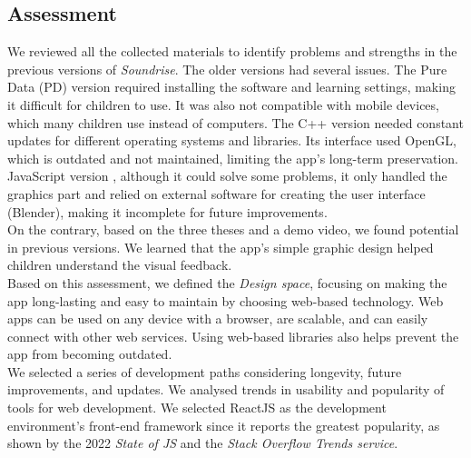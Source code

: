 \subsection*{Assessment}
We reviewed all the collected materials to identify problems and strengths in the previous versions of \textit{Soundrise}. The older versions had several issues. The Pure Data (PD) version \cite{giusto2012soundrise} required installing the software and learning settings, making it difficult for children to use. It was also not compatible with mobile devices, which many children use instead of computers. The C++ \cite{randon2012soundrise} version needed constant updates for different operating systems and libraries. Its interface used OpenGL, which is outdated and not maintained, limiting the app’s long-term preservation. JavaScript version \cite{turetta2023soundrise}, although it could solve some problems, it only handled the graphics part and relied on external software for creating the user interface (Blender), making it incomplete for future improvements.\\
On the contrary, based on the three theses and a demo video, we found potential in previous versions. We learned that the app’s simple graphic design helped children understand the visual feedback.\\
Based on this assessment, we defined the \textit{Design space}, focusing on making the app long-lasting and easy to maintain by choosing web-based technology. Web apps can be used on any device with a browser, are scalable, and can easily connect with other web services. Using web-based libraries also helps prevent the app from becoming outdated.\\
We selected a series of development paths considering longevity, future improvements, and updates. We analysed trends in usability and popularity of tools for web development. We selected ReactJS as the development environment’s front-end framework since it reports the greatest popularity, as shown by the 2022 \textit{State of JS} and the \textit{Stack Overflow Trends service}.

